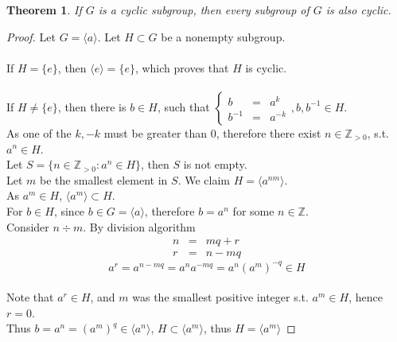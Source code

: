 \documentclass{article}
\theoremstyle{MyNonumberplain}
\theoremstyle{break}
\newtheorem*{proof}{Proof. }
\newcommand{\cyclic}[1]{\langle #1 \rangle}
\theoremstyle{break}
\newtheorem{theorem}{Theorem}[section]
\theoremstyle{break}
\theoremstyle{definition}
\theoremstyle{break}
\begin{document}
\begin{thmbox}
    \begin{theorem}
        If $G$ is a cyclic subgroup, then every subgroup of $G$ is also cyclic.
    \end{theorem}
    \begin{prfbox}
        \begin{proof}
            Let $G=\cyclic{a}$. Let $H\subset G$ be a nonempty subgroup.\\\\
            If $H=\{e\}$, then $\cyclic{e}=\{e\}$, which proves that $H$ is cyclic.\\\\
            If $H\neq\{e\}$, then there is $b\in H$, such that 
            $\left\{\begin{array}{lll}
                b & = & a^k\\
                b^{- 1} & = & a^{- k}
              \end{array}\right., b, b^{- 1} \in H$.\\
    
              As one of the $k, - k$ must be greater than 0, therefore there
              exist $n \in \mathbb{Z}_{> 0}$, s.t. $a^n \in H$.\\
              
              Let $S = \{ n \in \mathbb{Z}_{> 0} : a^n \in H \}$, then $S$ is not empty.\\
              
              Let $m$ be the smallest element in $S$. We claim $H = \cyclic{a^{nm}}.$\\
              
              As $a^m \in H$, $\cyclic{a^m} \subset H$.\\
              
              For $b \in H$, since $b \in G = \cyclic{a}$, therefore $b = a^n$ for some $n \in \mathbb{Z}.$\\
              
              Consider $n \div m$. By division algorithm\\
              \begin{eqnarray*}
                n & = & m q + r\\
                r & = & n - m q
              \end{eqnarray*}
              \[ a^r = a^{n - m q} = a^n a^{- m q} = a^n (a^m)^{- q} \in H \]\\
              Note that $a^r \in H$, and $m$ was the smallest positive integer s.t. $a^m \in
              H$, hence $r = 0$.\\
              
              Thus $b = a^n = (a^m)^q \in \cyclic{a^n}$, $H \subset \cyclic{a^m}$, thus $H = \cyclic{a^m}$
        \end{proof}
    \end{prfbox}
    
\end{thmbox}
\end{document}
